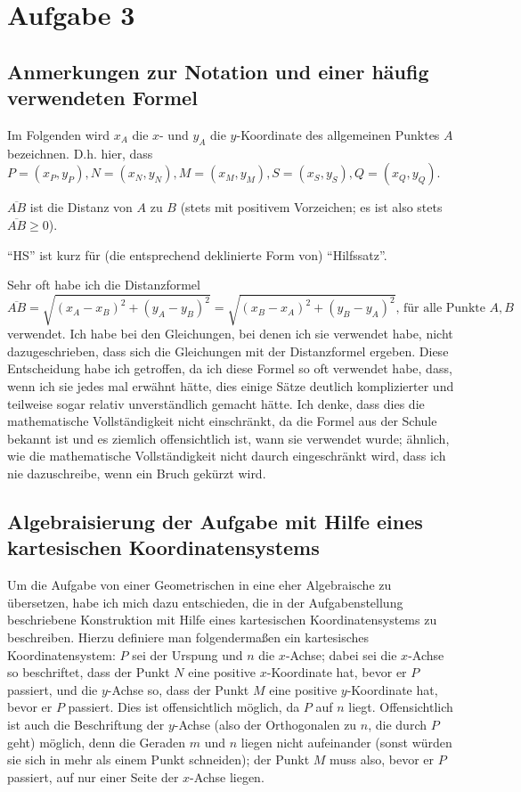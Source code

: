 \section{Aufgabe 3}

\subsection*{Anmerkungen zur Notation und einer häufig verwendeten Formel}

Im Folgenden wird $x_A$ die $x$- und $y_A$ die $y$-Koordinate des allgemeinen Punktes $A$ bezeichnen. D.h. hier, dass 
$P=(x_P, y_P), N=(x_N, y_N), M=(x_M, y_M), S=(x_S, y_S), Q=(x_Q, y_Q)$.

$\overline{AB}$ ist die Distanz von $A$ zu $B$ (stets mit positivem Vorzeichen; es ist also stets $\overline{AB}
\geq 0$).

"`HS"' ist kurz für (die entsprechend deklinierte Form von) "`Hilfssatz"'.

Sehr oft habe ich die Distanzformel 
\[\overline{AB}=\sqrt{(x_A-x_B)^2+(y_A-y_B)^2}=\sqrt{(x_B-x_A)^2+(y_B-y_A)^2}\text{, für alle Punkte $A,B$}\] 
verwendet. Ich habe bei den Gleichungen, bei denen ich sie verwendet habe, nicht dazugeschrieben, dass sich die 
Gleichungen mit der Distanzformel ergeben. Diese Entscheidung habe ich getroffen, da ich diese Formel so oft verwendet 
habe, dass, wenn ich sie jedes mal erwähnt hätte, dies einige Sätze deutlich komplizierter und teilweise sogar 
relativ unverständlich gemacht hätte. Ich denke, dass dies die mathematische Vollständigkeit nicht einschränkt, da 
die Formel aus der Schule bekannt ist und es ziemlich offensichtlich ist, wann sie verwendet wurde; ähnlich, wie 
die mathematische Vollständigkeit nicht daurch eingeschränkt wird, dass ich nie dazuschreibe, wenn ein Bruch 
gekürzt wird.

\subsection*{Algebraisierung der Aufgabe mit Hilfe eines kartesischen Koordinatensystems}

Um die Aufgabe von einer Geometrischen in eine eher Algebraische zu übersetzen, habe ich mich dazu entschieden, die 
in der Aufgabenstellung beschriebene Konstruktion mit Hilfe eines kartesischen Koordinatensystems zu beschreiben. 
Hierzu definiere man folgendermaßen ein kartesisches Koordinatensystem: $P$ sei der Urspung und $n$ die $x$-Achse; 
dabei sei die $x$-Achse so beschriftet, dass der Punkt $N$ eine positive $x$-Koordinate hat, bevor er $P$ passiert, 
und die $y$-Achse so, dass der Punkt $M$ eine positive $y$-Koordinate hat, bevor er $P$ passiert. Dies ist 
offensichtlich möglich, da $P$ auf $n$ liegt. Offensichtlich ist auch die Beschriftung der $y$-Achse (also der 
Orthogonalen zu $n$, die durch $P$ geht) möglich, denn die Geraden $m$ und $n$ liegen nicht aufeinander (sonst 
würden sie sich in mehr als einem Punkt schneiden); der Punkt $M$ muss also, bevor er $P$ passiert, auf nur einer 
Seite der $x$-Achse liegen.

